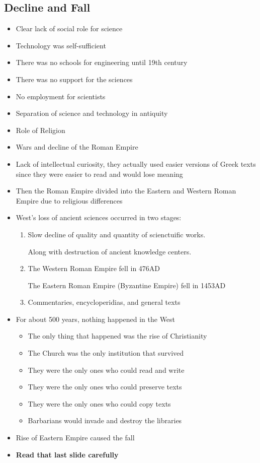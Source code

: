 \documentclass{article}
\begin{document}
\subsection{Decline and Fall}
\begin{itemize}
  \item Clear lack of social role for science
  \item Technology was self-sufficient
  \item There was no schools for engineering until 19th century
  \item There was no support for the sciences
  \item No employment for scientists
  \item Separation of science and technology in antiquity
  \item Role of Religion
  \item Wars and decline of the Roman Empire
  \item Lack of intellectual curiosity,
    they actually used easier versions of Greek texts since
    they were easier to read and would lose meaning
  \item Then the Roman Empire divided into the Eastern and Western Roman Empire
    due to religious differences
  \item West's loss of ancient sciences occurred in two stages:
    \begin{enumerate}
      \item Slow decline of quality and quantity of scienctuific works.

        Along with destruction of ancient knowledge centers.
      \item The Western Roman Empire fell in 476AD

      The Eastern Roman Empire (Byzantine Empire) fell in 1453AD
      \item Commentaries, encycloperidias, and general texts
    \end{enumerate}
  \item For about 500 years, nothing happened in the West
    \begin{itemize}
      \item The only thing that happened was the rise of Christianity
      \item The Church was the only institution that survived
      \item They were the only ones who could read and write
      \item They were the only ones who could preserve texts
      \item They were the only ones who could copy texts
      \item Barbarians would invade and destroy the libraries
    \end{itemize}
  \item Rise of Eastern Empire caused the fall
  \item \textbf{Read that last slide carefully}
\end{itemize}
\end{document}
